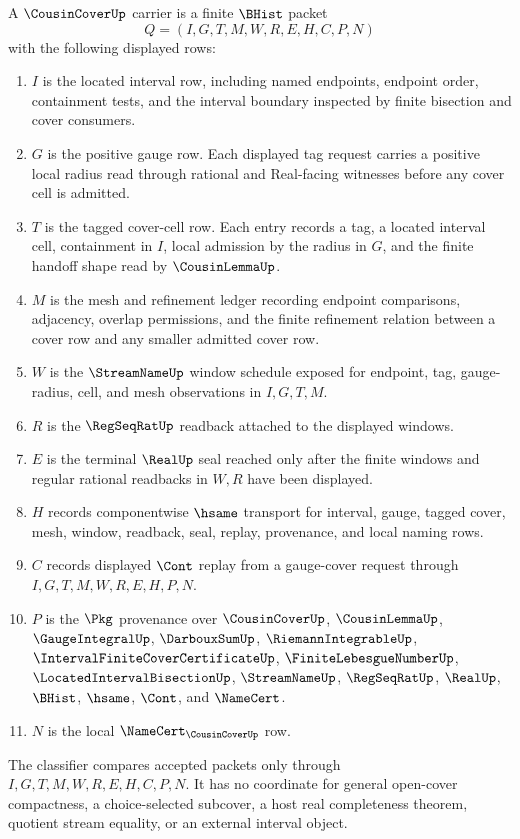 \begin{definition}
\label{def:cousin-cover-carrier}
A $\CousinCoverUp$ carrier is a finite $\BHist$ packet
$$
Q=(I,G,T,M,W,R,E,H,C,P,N)
$$
with the following displayed rows:
\begin{enumerate}
\item $I$ is the located interval row, including named endpoints, endpoint order, containment tests, and the interval boundary inspected by finite bisection and cover consumers.
\item $G$ is the positive gauge row. Each displayed tag request carries a positive local radius read through rational and Real-facing witnesses before any cover cell is admitted.
\item $T$ is the tagged cover-cell row. Each entry records a tag, a located interval cell, containment in $I$, local admission by the radius in $G$, and the finite handoff shape read by $\CousinLemmaUp$.
\item $M$ is the mesh and refinement ledger recording endpoint comparisons, adjacency, overlap permissions, and the finite refinement relation between a cover row and any smaller admitted cover row.
\item $W$ is the $\StreamNameUp$ window schedule exposed for endpoint, tag, gauge-radius, cell, and mesh observations in $I,G,T,M$.
\item $R$ is the $\RegSeqRatUp$ readback attached to the displayed windows.
\item $E$ is the terminal $\RealUp$ seal reached only after the finite windows and regular rational readbacks in $W,R$ have been displayed.
\item $H$ records componentwise $\hsame$ transport for interval, gauge, tagged cover, mesh, window, readback, seal, replay, provenance, and local naming rows.
\item $C$ records displayed $\Cont$ replay from a gauge-cover request through $I,G,T,M,W,R,E,H,P,N$.
\item $P$ is the $\Pkg$ provenance over $\CousinCoverUp$, $\CousinLemmaUp$, $\GaugeIntegralUp$, $\DarbouxSumUp$, $\RiemannIntegrableUp$, $\IntervalFiniteCoverCertificateUp$, $\FiniteLebesgueNumberUp$, $\LocatedIntervalBisectionUp$, $\StreamNameUp$, $\RegSeqRatUp$, $\RealUp$, $\BHist$, $\hsame$, $\Cont$, and $\NameCert$.
\item $N$ is the local $\NameCert_{\CousinCoverUp}$ row.
\end{enumerate}
The classifier compares accepted packets only through $I,G,T,M,W,R,E,H,C,P,N$. It has no coordinate for general open-cover compactness, a choice-selected subcover, a host real completeness theorem, quotient stream equality, or an external interval object.
\end{definition}

